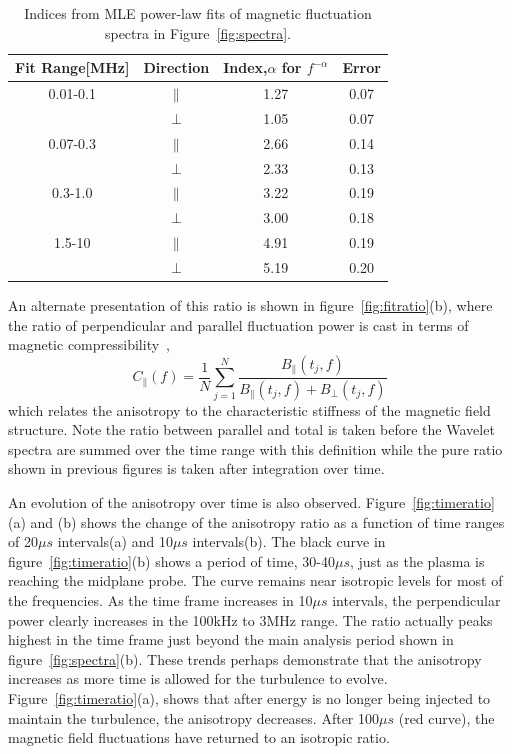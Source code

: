\documentclass[aip,prl,amsmath,amssymb,reprint,superscriptaddress]{revtex4-1} %
\begin{document}
\begin{table}
\caption{\label{tab:Bindices}Indices from MLE power-law fits of magnetic fluctuation spectra in Figure~\ref{fig:spectra}.}
\begin{tabular}{cccc}
\toprule
Fit Range[MHz]	&	Direction		&	Index,$\alpha$ for $f^{-\alpha}$	&Error\\
\hline
0.01-0.1				& $\parallel$	& 1.27															&0.07\\
								& $\perp$			& 1.05  														&0.07\\
\hline
0.07-0.3				& $\parallel$	& 2.66															&0.14\\
								& $\perp$			& 2.33  														&0.13\\
\hline
0.3-1.0					& $\parallel$	& 3.22															&0.19\\
								& $\perp$			& 3.00  														&0.18\\
\hline
1.5-10					& $\parallel$	& 4.91															&0.19\\
								& $\perp$			& 5.19  														&0.20\\
\hline
\end{tabular}
\end{table}

An alternate presentation of this ratio is shown in figure~\ref{fig:fitratio}(b), where the ratio of perpendicular and parallel fluctuation power is cast in terms of magnetic compressibility~\cite{kiyani13},
\begin{equation}
C_{\parallel}(f) = \frac{1}{N}\sum^{N}_{j=1}\frac{B_{\parallel}(t_{j},f)}{B_{\parallel}(t_{j},f)+B_{\perp}(t_{j},f)}
\label{eq:magcompress}
\end{equation}
which relates the anisotropy to the characteristic stiffness of the magnetic field structure. Note the ratio between parallel and total is taken before the Wavelet spectra are summed over the time range with this definition while the pure ratio shown in previous figures is taken after integration over time.

An evolution of the anisotropy over time is also observed. Figure~\ref{fig:timeratio}(a) and (b) shows the change of the anisotropy ratio as a function of time ranges of 20$\mu s$ intervals(a) and 10$\mu s$ intervals(b). The black curve in figure~\ref{fig:timeratio}(b) shows a period of time, 30-40$\mu s$, just as the plasma is reaching the midplane probe. The curve remains near isotropic levels for most of the frequencies. As the time frame increases in 10$\mu s$ intervals, the perpendicular power clearly increases in the 100kHz to 3MHz range. The ratio actually peaks highest in the time frame just beyond the main analysis period shown in figure~\ref{fig:spectra}(b). These trends perhaps demonstrate that the anisotropy increases as more time is allowed for the turbulence to evolve. Figure~\ref{fig:timeratio}(a), shows that after energy is no longer being injected to maintain the turbulence, the anisotropy decreases. After 100$\mu s$ (red curve), the magnetic field fluctuations have returned to an isotropic ratio.
\end{document}
